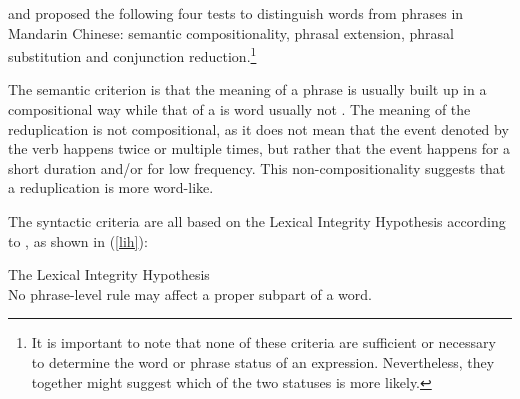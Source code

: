 \citet{Duanmu1998} and \citet{Schaefer2009} proposed the following four tests to
distinguish words from phrases in Mandarin Chinese: semantic compositionality, phrasal extension,
phrasal substitution and conjunction reduction.\footnote{It is important to note that none of these criteria are sufficient or necessary to determine the word or phrase status of an expression. Nevertheless, they together might suggest which of the two statuses is more likely.}

The semantic criterion is that the meaning of a phrase is usually built up in a compositional way while that of a is word usually not \citetext{\citealp[140]{Duanmu1998}; \citealp[275]{Schaefer2009}}. 
The meaning of the reduplication is not compositional, as it does not mean that the event denoted by the verb happens twice or multiple times, but rather that the event happens for a short duration and/or for low frequency.
This non-compositionality suggests that a reduplication is more word-like.


The syntactic criteria are all based on the Lexical Integrity Hypothesis according to \citet[60]{Huang1984}, as shown in (\ref{lih}):

\ea\label{lih}The Lexical Integrity Hypothesis\\
No phrase-level rule may affect a proper subpart of a word.
\z

